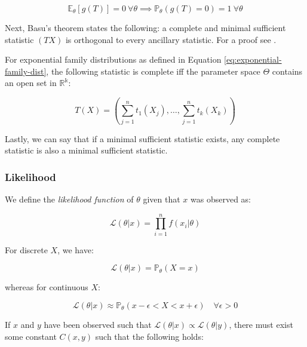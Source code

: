 \documentclass{report}
\begin{document}
\begin{equation}\label{eq:complete-statistic}
    \mathbb{E}_\theta[g(T)] = 0 \: \forall \theta \implies \mathbb{P}_\theta(g(T) = 0) = 1 \: \forall \theta 
\end{equation}

Next, Basu's theorem states the following: a complete and minimal sufficient statistic $(TX)$ is orthogonal to every ancillary statistic. For a proof see \cite[Chapter~6.2.4]{casella_statistical_2002}. 

For exponential family distributions as defined in Equation \ref{eq:exponential-family-dist}, the following statistic is complete \gls{iff} the parameter space $\Theta$ contains an open set in $\mathbb{R^k}$:

\begin{equation}\label{eq:complete-statistic-exponential-family}
    T(X) = \left(\sum_{j=1}^n t_1(X_j), \dots, \sum_{j=1}^n t_k(X_k)\right)
\end{equation}

Lastly, we can say that if a minimal sufficient statistic exists, any complete statistic is also a minimal sufficient statistic. 

\subsubsection{Likelihood}

We define the \textit{likelihood function} of $\theta$ given that $x$ was observed as:

\begin{equation}\label{eq:likelihood-function}
    \mathcal{L}(\theta|x) = \prod_{i=1}^n f(x_i|\theta)
\end{equation}

For discrete $X$, we have:

\begin{equation}\label{eq:likelihood-function-discrete}
    \mathcal{L}(\theta|x) = \mathbb{P}_\theta(X = x)
\end{equation}

whereas for continuous $X$:

\begin{equation}\label{eq:likelihood-function-continuous}
    \mathcal{L}(\theta|x) \approx \mathbb{P}_\theta(x - \epsilon < X < x + \epsilon) \quad \forall \epsilon > 0
\end{equation}

If $x$ and $y$ have been observed such that $\mathcal{L}(\theta|x) \propto \mathcal{L}(\theta|y)$, there must exist some constant $C(x,y)$ such that the following holds:
\end{document}
